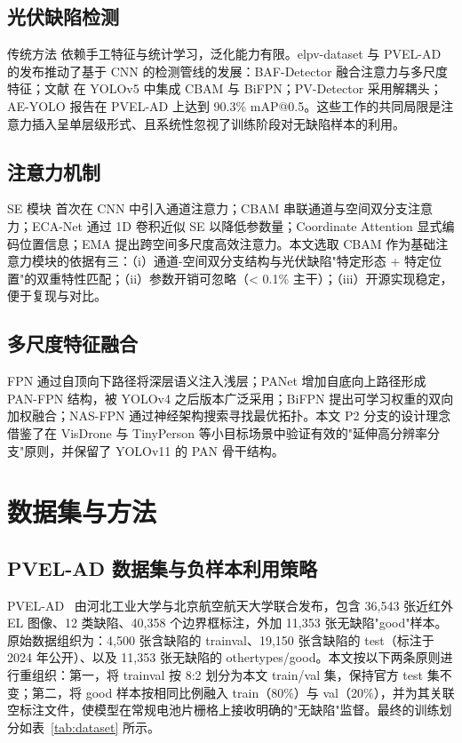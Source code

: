 \documentclass[journal,onecolumn,11pt]{IEEEtran}
\begin{document}
\subsection{光伏缺陷检测}
传统方法 \cite{tsanakas2016review,anwar2014micro} 依赖手工特征与统计学习，泛化能力有限。elpv-dataset \cite{deitsch2019automatic} 与 PVEL-AD \cite{su2023pvelad} 的发布推动了基于 CNN 的检测管线的发展：BAF-Detector \cite{su2022baf} 融合注意力与多尺度特征；文献 \cite{wang2023yolo5pv} 在 YOLOv5 中集成 CBAM 与 BiFPN；PV-Detector \cite{liu2024pvdetector} 采用解耦头；AE-YOLO \cite{aeyolo2025} 报告在 PVEL-AD 上达到 90.3\% mAP@0.5。这些工作的共同局限是注意力插入呈单层级形式、且系统性忽视了训练阶段对无缺陷样本的利用。

\subsection{注意力机制}
SE 模块 \cite{hu2018senet} 首次在 CNN 中引入通道注意力；CBAM \cite{woo2018cbam} 串联通道与空间双分支注意力；ECA-Net \cite{wang2020ecanet} 通过 1D 卷积近似 SE 以降低参数量；Coordinate Attention \cite{hou2021coordatt} 显式编码位置信息；EMA \cite{ouyang2023ema} 提出跨空间多尺度高效注意力。本文选取 CBAM 作为基础注意力模块的依据有三：（i）通道-空间双分支结构与光伏缺陷"特定形态 + 特定位置"的双重特性匹配；（ii）参数开销可忽略（< 0.1\% 主干）；（iii）开源实现稳定，便于复现与对比。

\subsection{多尺度特征融合}
FPN \cite{lin2017fpn} 通过自顶向下路径将深层语义注入浅层；PANet \cite{liu2018panet} 增加自底向上路径形成 PAN-FPN 结构，被 YOLOv4 之后版本广泛采用；BiFPN \cite{tan2020efficientdet} 提出可学习权重的双向加权融合；NAS-FPN \cite{ghiasi2019nasfpn} 通过神经架构搜索寻找最优拓扑。本文 P2 分支的设计理念借鉴了在 VisDrone \cite{zhu2022visdrone} 与 TinyPerson \cite{yu2020tinyperson} 等小目标场景中验证有效的"延伸高分辨率分支"原则，并保留了 YOLOv11 的 PAN 骨干结构。

\section{数据集与方法}
\label{sec:method}

\subsection{PVEL-AD 数据集与负样本利用策略}
\label{sec:dataset}
PVEL-AD~\cite{su2023pvelad} 由河北工业大学与北京航空航天大学联合发布，包含 36{,}543 张近红外 EL 图像、12 类缺陷、40{,}358 个边界框标注，外加 11{,}353 张无缺陷"good"样本。原始数据组织为：4{,}500 张含缺陷的 trainval、19{,}150 张含缺陷的 test（标注于 2024 年公开）、以及 11{,}353 张无缺陷的 othertypes/good。本文按以下两条原则进行重组织：第一，将 trainval 按 8:2 划分为本文 train/val 集，保持官方 test 集不变；第二，将 good 样本按相同比例融入 train（80\%）与 val（20\%），并为其关联空标注文件，使模型在常规电池片栅格上接收明确的"无缺陷"监督。最终的训练划分如表~\ref{tab:dataset} 所示。
\end{document}
